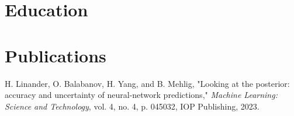 \documentclass[letterpaper]{twentysecondcv} %
\begin{document}
\section{Education}

\education


\section{Publications}
H. Linander, O. Balabanov, H. Yang, and B. Mehlig, "Looking at the
posterior: accuracy and uncertainty of neural-network predictions,"
\textit{Machine Learning: Science and Technology}, vol. 4, no. 4, p.
045032, IOP Publishing, 2023.\vspace{2mm}
\end{document}

